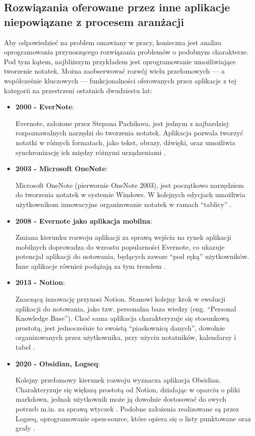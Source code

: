 \subsection{Rozwiązania oferowane przez inne aplikacje niepowiązane z procesem aranżacji}
Aby odpowiedzieć na problem omawiany w pracy, konieczna jest analiza oprogramowania przynoszącego rozwiązania problemów
o podobnym charakterze. Pod tym kątem, najbliższym przykładem jest oprogramowanie umożliwiające
tworzenie notatek. Można zaobserwować rozwój wielu przełomowych — a współcześnie kluczowych — funkcjonalności oferowanych
przez aplikacje z tej kategorii na przestrzeni ostatnich dwudziestu lat:
\begin{itemize}
	\item \textbf{2000 - EverNote}:

	      Evernote, założone przez Stepana Pachikova, jest jednym z najbardziej rozpoznawalnych narzędzi do tworzenia
	      notatek. Aplikacja pozwala tworzyć notatki w różnych formatach, jako tekst, obrazy, dźwięki,
	      oraz umożliwia synchronizację ich między różnymi urządzeniami \cite{evernote}.
	\item \textbf{2003 - Microsoft OneNote}:

	      Microsoft OneNote (pierwornie OneNote 2003), jest początkowo narzędziem do tworzenia notatek w systemie
	      Windows. W kolejnych edycjach umożliwia użytkownikom innowacyjne organizowanie notatek w ramach \enquote{tablicy} \cite{onenote}.
	\item \textbf{2008 - Evernote jako aplikacja mobilna}:

	      Zmiana kierunku rozwoju aplikacji za sprawą wejścia na rynek aplikacji mobilnych doprowadza do wzrostu
	      popularności Evernote,
	      co ukazuje potencjał aplikacji do notowania, będących zawsze \enquote{pod ręką} użytkowników.
	      Inne aplikacje również podążają za tym trendem \cite{evernote}.
	\item \textbf{2013 - Notion}:

	      Znaczącą innowację przynosi Notion. Stanowi kolejny krok w ewolucji aplikacji do notowania, jako tzw. personalna
	      baza wiedzy (eng. \enquote{Personal Knowledge Base}).
	      Choć sama aplikacja charakteryzuje się stosunkową prostotą, jest jednocześnie to swoistą \enquote{piaskownicą danych},
	      dowolnie organizowanych przez użytkownika, przy użyciu notatników, kalendarzy i tabel \cite{notion}.
	\item \textbf{2020 - Obsidian, Logseq}:

	      Kolejny przełomowy kierunek rozwoju wyznacza aplikacja Obsidian. Charakteryzuje się większą prostotą od Notion,
	      działając w oparciu o pliki markdown, jednak użytkownik może ją dowolnie dostosować do swych potrzeb m.in.
	      za sprawą wtyczek \cite{obsidian}.
	      Podobne założenia realizowane są przez Logseq,
	      oprogramowanie open-source, które opiera się o listy punktowane oraz grafy \cite{logseq}.
\end{itemize}
